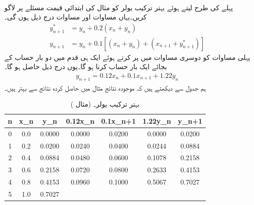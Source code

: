 \quad {}\\
پہلے کی طرح  لیتے ہوئے بہتر ترکیب یولر کو مثال  کی ابتدائی قیمت مسئلے پر لاگو کریں۔یہاں مساوات  اور مساوات  درج ذیل ہوں گی۔
\begin{align*}
y^*_{n+1}&=y_n+0.2(x_n+y_n)\\
y_{n+1}&=y_n+0.1[(x_n+y_n)+(x_{n+1}+y^*_{n+1})]
\end{align*}
پہلی مساوات کو دوسری مساوات میں پر کرتے ہوئے ایک ہی قدم میں دو بار حساب کے بجائے ایک بار حساب کرنا ہو گا۔یوں درج ذیل حاصل ہو گا۔
\begin{align*}
y_{n+1}=0.12x_n+0.1x_{n+1}+1.22y_n
\end{align*}
ہم جدول  سے دیکھتے ہیں کہ موجودہ نتائج مثال  میں حاصل کردہ نتائج سے بہتر ہیں۔
\begin{table}
\caption{بہتر ترکیب یولر۔ (مثال )}
\label{جدول_مثال_اعدادی_بہتر_ترکیب_یولر_الف}
\centering
\begin{tabular}{|C|C|C|C|C|C|C|}
\hline
n&x_n&y_n&0.12x_n&0.1x_{n+1}&1.22y_n&y_{n+1}\\
&0.0&0.0000&0.0000&0.0200&0.0000&0.0200\\
1&0.2&0.0200&0.0240&0.0400&0.0244&0.0884\\
2&0.4&0.0884&0.0480&0.0600&0.1078&0.2158\\
3&0.6&0.2158&0.0720&0.0800&0.2633&0.4153\\
4&0.8&0.4153&0.0960&0.1000&0.5067&0.7027\\
5&1.0&0.7027&&&&\\
\hline
\end{tabular}

\end{table}

